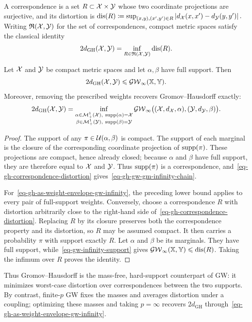 A correspondence is a set $R\subset\mathcal{X}\times\mathcal{Y}$ whose two coordinate projections are surjective, and its distortion is \(\operatorname{dis}(R) \coloneqq \sup_{(x,y),(x',y')\in R} \left\lvert d_{\mathcal{X}}(x,x')-d_{\mathcal{Y}}(y,y')\right\rvert.\)
Writing $\mathfrak R(\mathcal{X},\mathcal{Y})$ for the set of correspondences, compact metric spaces satisfy the classical identity
\begin{equation}\label{eq-gh-correspondence-distortion}
2d_{\mathrm{GH}}(\mathcal{X},\mathcal{Y})
=
\inf_{R\in\mathfrak R(\mathcal{X},\mathcal{Y})}\operatorname{dis}(R).
\end{equation}
\begin{prop}\label{prop-gh-gm-gw-infinity}
Let $\mathcal{X}$ and $\mathcal{Y}$ be compact metric spaces and let $\alpha,\beta$ have full support. Then
\begin{equation}\label{eq-gh-gw-gm-infinity-chain}
2d_{\mathrm{GH}}(\mathcal{X},\mathcal{Y})
\leqslant
\operatorname{\mathcal{GW}}_\infty(\mathbb{X},\mathbb{Y}).
\end{equation}
Moreover, removing the prescribed weights recovers Gromov--Hausdorff exactly:
\begin{equation}\label{eq-gh-as-weight-envelope-gw-infinity}
2d_{\mathrm{GH}}(\mathcal{X},\mathcal{Y})
=
\inf_{\substack{\alpha\in\mathcal{M}_+^1(\mathcal{X}),\ \operatorname{supp}(\alpha)=\mathcal{X}\\
\beta\in\mathcal{M}_+^1(\mathcal{Y}),\ \operatorname{supp}(\beta)=\mathcal{Y}}}
\operatorname{\mathcal{GW}}_\infty\bigl((\mathcal{X},d_{\mathcal{X}},\alpha),(\mathcal{Y},d_{\mathcal{Y}},\beta)\bigr).
\end{equation}
\end{prop}
\begin{proof}
The support of any $\pi\in\mathcal{U}(\alpha,\beta)$ is compact. The support of each marginal is the closure of the corresponding coordinate projection of $\operatorname{supp}(\pi)$. These projections are compact, hence already closed; because $\alpha$ and $\beta$ have full support, they are therefore equal to $\mathcal{X}$ and $\mathcal{Y}$. Thus $\operatorname{supp}(\pi)$ is a correspondence, and~\eqref{eq-gh-correspondence-distortion} gives~\eqref{eq-gh-gw-gm-infinity-chain}.

For~\eqref{eq-gh-as-weight-envelope-gw-infinity}, the preceding lower bound applies to every pair of full-support weights. Conversely, choose a correspondence $R$ with distortion arbitrarily close to the right-hand side of~\eqref{eq-gh-correspondence-distortion}. Replacing $R$ by its closure preserves both the correspondence property and its distortion, so $R$ may be assumed compact. It then carries a probability $\pi$ with support exactly $R$. Let $\alpha$ and $\beta$ be its marginals. They have full support, while~\eqref{eq-gw-infinity-support} gives $\operatorname{\mathcal{GW}}_\infty(\mathbb{X},\mathbb{Y})\leqslant\operatorname{dis}(R)$. Taking the infimum over $R$ proves the identity.
\end{proof}
Thus Gromov--Hausdorff is the mass-free, hard-support counterpart of GW: it minimizes worst-case distortion over correspondences between the two supports. By contrast, finite-$p$ GW fixes the masses and averages distortion under a coupling; optimizing these masses and taking $p=\infty$ recovers $2d_{\mathrm{GH}}$ through~\eqref{eq-gh-as-weight-envelope-gw-infinity}.

